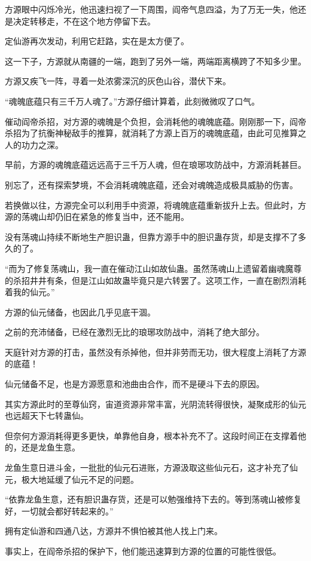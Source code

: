 \begin{this_body}
方源眼中闪烁冷光，他迅速扫视了一下周围，阎帝气息四溢，为了万无一失，他还是决定转移走，不在这个地方停留下去。

定仙游再次发动，利用它赶路，实在是太方便了。

这一下子，方源就从南疆的一端，跑到了另外一端，两端距离横跨了不知多少里。

方源又疾飞一阵，寻着一处浓雾深沉的灰色山谷，潜伏下来。

“魂魄底蕴只有三千万人魂了。”方源仔细计算着，此刻微微叹了口气。

催动阎帝杀招，对方源的魂魄是个负担，会消耗他的魂魄底蕴。刚刚那一下，阎帝杀招为了抗衡神秘敌手的推算，就消耗了方源上百万的魂魄底蕴，由此可见推算之人的功力之深。

早前，方源的魂魄底蕴远远高于三千万人魂，但在琅琊攻防战中，方源消耗甚巨。

别忘了，还有探索梦境，不会消耗魂魄底蕴，还会对魂魄造成极具威胁的伤害。

若换做以往，方源完全可以利用手中资源，将魂魄底蕴重新拔升上去。但此时，方源的荡魂山却仍旧在紧急的修复当中，还不能用。

没有荡魂山持续不断地生产胆识蛊，但靠方源手中的胆识蛊存货，却是支撑不了多久的了。

“而为了修复荡魂山，我一直在催动江山如故仙蛊。虽然荡魂山上遗留着幽魂魔尊的杀招井井有条，但是江山如故蛊毕竟只是六转罢了。这项工作，一直在剧烈消耗着我的仙元。”

方源的仙元储备，也因此几乎见底干涸。

之前的充沛储备，已经在激烈无比的琅琊攻防战中，消耗了绝大部分。

天庭针对方源的打击，虽然没有杀掉他，但并非劳而无功，很大程度上消耗了方源的底蕴！

仙元储备不足，也是方源愿意和池曲由合作，而不是硬斗下去的原因。

其实方源此时的至尊仙窍，宙道资源非常丰富，光阴流转得很快，凝聚成形的仙元也远超天下七转蛊仙。

但奈何方源消耗得更多更快，单靠他自身，根本补充不了。这段时间正在支撑着他的，还是龙鱼生意。

龙鱼生意日进斗金，一批批的仙元石进账，方源汲取这些仙元石，这才补充了仙元，极大地延缓了仙元不足的问题。

“依靠龙鱼生意，还有胆识蛊存货，还是可以勉强维持下去的。等到荡魂山被修复好，一切就会都好转起来的。”

拥有定仙游和四通八达，方源并不惧怕被其他人找上门来。

事实上，在阎帝杀招的保护下，他们能迅速算到方源的位置的可能性很低。


\end{this_body}

